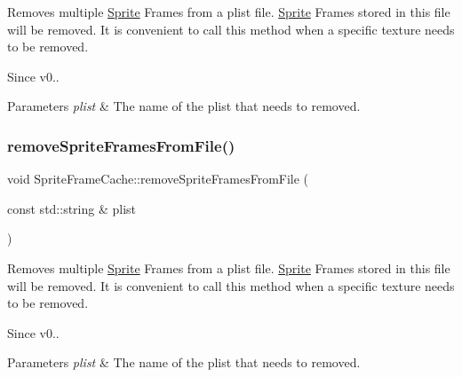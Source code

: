 Removes multiple \hyperlink{classSprite}{Sprite} Frames from a plist file. \hyperlink{classSprite}{Sprite} Frames stored in this file will be removed. It is convenient to call this method when a specific texture needs to be removed. \begin{DoxySince}{Since}
v0..
\end{DoxySince}

\begin{DoxyParams}{Parameters}
{\em plist} & The name of the plist that needs to removed. \\
\hline
\end{DoxyParams}
\mbox{\label{classSpriteFrameCache_a1edf0ddf258ccb7ea843379f5b99aac5}} 
\subsubsection{\texorpdfstring{remove\+Sprite\+Frames\+From\+File()}{removeSpriteFramesFromFile()}\hspace{0.1cm}{\footnotesize\ttfamily [2/2]}}
{\footnotesize\ttfamily void Sprite\+Frame\+Cache\+::remove\+Sprite\+Frames\+From\+File (\begin{DoxyParamCaption}\item[{const std\+::string \&}]{plist }\end{DoxyParamCaption})}

Removes multiple \hyperlink{classSprite}{Sprite} Frames from a plist file. \hyperlink{classSprite}{Sprite} Frames stored in this file will be removed. It is convenient to call this method when a specific texture needs to be removed. \begin{DoxySince}{Since}
v0..
\end{DoxySince}

\begin{DoxyParams}{Parameters}
{\em plist} & The name of the plist that needs to removed. \\
\hline
\end{DoxyParams}
\mbox{\label{classSpriteFrameCache_afbc12b894257ad87d0e638b9ce7decab}} 
